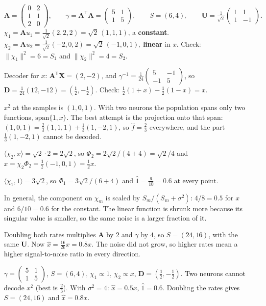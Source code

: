 \documentclass[11pt,letterpaper]{article}
\newcommand{\T}{\mathsf{T}}
\newcommand{\ans}[1]{\par\vspace{4pt}{\bfseries #1}\quad}
\begin{document}
\ans{Q1}
\[
\mathbf A = \begin{pmatrix} 0 & 2 \\ 1 & 1 \\ 2 & 0 \end{pmatrix}, \qquad
\gamma = \mathbf A^\T\mathbf A = \begin{pmatrix} 5 & 1 \\ 1 & 5 \end{pmatrix}, \qquad
S = (6, 4), \qquad \mathbf U = \tfrac{1}{\sqrt2}\begin{pmatrix} 1 & 1 \\ 1 & -1 \end{pmatrix}.
\]
$\chi_1 = \mathbf A u_1 = \tfrac1{\sqrt2}(2, 2, 2) = \sqrt2\,(1, 1, 1)$, a \textbf{constant}. $\chi_2 = \mathbf A u_2 = \tfrac{1}{\sqrt2}(-2, 0, 2) = \sqrt2\,(-1, 0, 1)$, \textbf{linear} in $x$. Check: $\|\chi_1\|^2 = 6 = S_1$ and $\|\chi_2\|^2 = 4 = S_2$.

Decoder for $x$: $\mathbf A^\T\mathbf X = (2, -2)$, and $\gamma^{-1} = \frac{1}{24}\begin{pmatrix} 5 & -1 \\ -1 & 5\end{pmatrix}$, so $\mathbf D = \frac{1}{24}(12, -12) = (\tfrac12, -\tfrac12)$. Check: $\tfrac12(1 + x) - \tfrac12(1 - x) = x$. \checkmark

$x^2$ at the samples is $(1, 0, 1)$. With two neurons the population spans only two functions, $\mathrm{span}\{1, x\}$. The best attempt is the projection onto that span: $(1, 0, 1) = \tfrac23(1, 1, 1) + \tfrac13(1, -2, 1)$, so $\hat f = \tfrac23$ everywhere, and the part $\tfrac13(1, -2, 1)$ cannot be decoded.

\ans{Q2}
$\langle\chi_2, x\rangle = \sqrt2\cdot2 = 2\sqrt2$, so $\Phi_2 = 2\sqrt2/(4 + 4) = \sqrt2/4$ and $\hat x = \chi_2\Phi_2 = \tfrac12(-1, 0, 1) = \tfrac12 x$.

$\langle\chi_1, 1\rangle = 3\sqrt2$, so $\Phi_1 = 3\sqrt2/(6 + 4)$ and $\hat 1 = \tfrac{6}{10} = 0.6$ at every point.

In general, the component on $\chi_m$ is scaled by $S_m/(S_m + \sigma^2)$: $4/8 = 0.5$ for $x$ and $6/10 = 0.6$ for the constant. The linear function is shrunk more because its singular value is smaller, so the same noise is a larger fraction of it.

Doubling both rates multiplies $\mathbf A$ by $2$ and $\gamma$ by $4$, so $S = (24, 16)$, with the same $\mathbf U$. Now $\hat x = \frac{16}{20}x = 0.8x$. The noise did not grow, so higher rates mean a higher signal-to-noise ratio in every direction.
\begin{result}
$\gamma = \begin{pmatrix} 5 & 1 \\ 1 & 5\end{pmatrix}$, $S = (6, 4)$, $\chi_1 \propto 1$, $\chi_2 \propto x$, $\mathbf D = (\tfrac12, -\tfrac12)$. Two neurons cannot decode $x^2$ (best is $\tfrac23$). With $\sigma^2 = 4$: $\hat x = 0.5x$, $\hat 1 = 0.6$. Doubling the rates gives $S = (24, 16)$ and $\hat x = 0.8x$.
\end{result}
\end{document}
